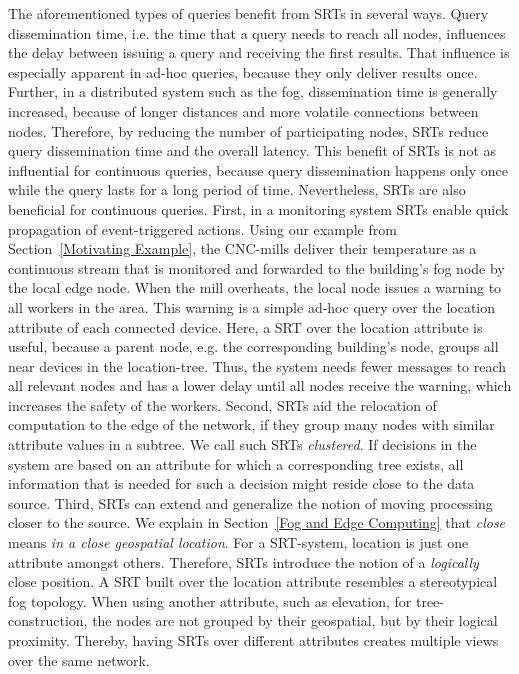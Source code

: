   The aforementioned types of queries benefit from SRTs in several ways. Query dissemination time,  i.e. the time that a query needs to reach all nodes, influences the delay between issuing a query and receiving the first results. That influence is especially apparent in ad-hoc queries, because they only deliver results once. Further, in a distributed system such as the fog, dissemination time is generally increased, because of longer distances and more volatile connections between nodes. Therefore, by reducing the number of participating nodes, SRTs reduce query dissemination time and the overall latency. This benefit of SRTs is not as influential for continuous queries, because query dissemination happens only once while the query lasts for a long period of time. Nevertheless, SRTs are also beneficial for continuous queries. First, in a monitoring system SRTs enable quick propagation of event-triggered actions. Using our example from Section~\ref{Motivating Example}, the CNC-mills deliver their temperature as a continuous stream that is monitored and forwarded to the building's fog node by the local edge node. When the mill overheats, the local node issues a warning to all workers in the area. This warning is a simple ad-hoc query over the location attribute of each connected device. Here, a SRT over the location attribute is useful, because a parent node, e.g. the corresponding building's node, groups all near devices in the location-tree. Thus, the system needs fewer messages to reach all relevant nodes and has a lower delay until all nodes receive the warning, which increases the safety of the workers. Second, SRTs aid the relocation of computation to the edge of the network, if they group many nodes with similar attribute values in a subtree. We call such SRTs \textit{clustered}. If decisions in the system are based on an attribute for which a corresponding tree exists, all information that is needed for such a decision might reside close to the data source. Third, SRTs can extend and generalize the notion of moving processing closer to the source. We explain in Section~\ref{Fog and Edge Computing} that \textit{close} means \textit{in a close geospatial location}. For a SRT-system, location is just one attribute amongst others. Therefore, SRTs introduce the notion of a \textit{logically} close position. A SRT built over the location attribute resembles a stereotypical fog topology. When using another attribute, such as elevation, for tree-construction, the nodes are not grouped by their geospatial, but by their logical proximity. Thereby, having SRTs over different attributes creates multiple views over the same network.

